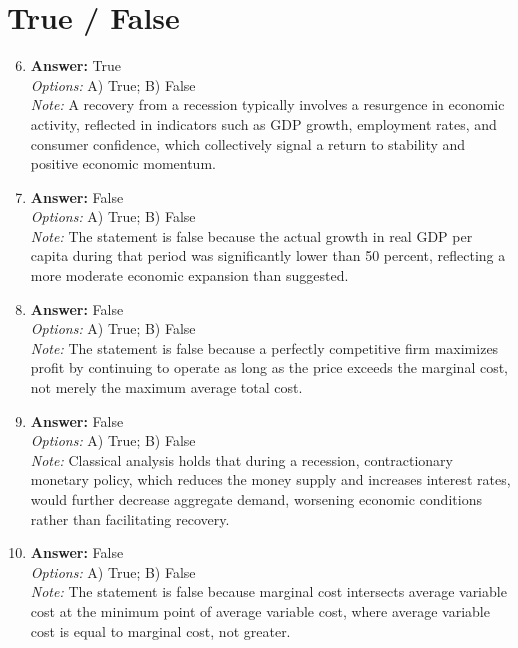 \documentclass[12pt]{article}
\begin{document}
\section*{True / False}
\begin{enumerate}[label=\arabic*.]
\setcounter{enumi}{5}
\item \textbf{Answer:} True
\\ \textit{Options:} A) True; B) False
\\ \textit{Note:} A recovery from a recession typically involves a resurgence in economic activity, reflected in indicators such as GDP growth, employment rates, and consumer confidence, which collectively signal a return to stability and positive economic momentum.
\item \textbf{Answer:} False
\\ \textit{Options:} A) True; B) False
\\ \textit{Note:} The statement is false because the actual growth in real GDP per capita during that period was significantly lower than 50 percent, reflecting a more moderate economic expansion than suggested.
\item \textbf{Answer:} False
\\ \textit{Options:} A) True; B) False
\\ \textit{Note:} The statement is false because a perfectly competitive firm maximizes profit by continuing to operate as long as the price exceeds the marginal cost, not merely the maximum average total cost.
\item \textbf{Answer:} False
\\ \textit{Options:} A) True; B) False
\\ \textit{Note:} Classical analysis holds that during a recession, contractionary monetary policy, which reduces the money supply and increases interest rates, would further decrease aggregate demand, worsening economic conditions rather than facilitating recovery.
\item \textbf{Answer:} False
\\ \textit{Options:} A) True; B) False
\\ \textit{Note:} The statement is false because marginal cost intersects average variable cost at the minimum point of average variable cost, where average variable cost is equal to marginal cost, not greater.
\end{enumerate}
\end{document}
